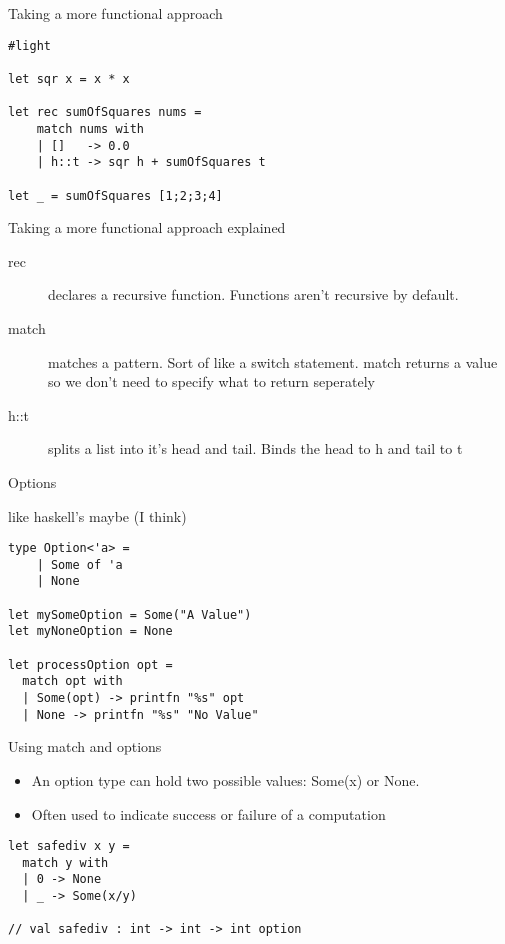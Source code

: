 \documentclass[landscape]{slides}
\begin{document}
\begin{slide}{Taking a more functional approach}
\begin{verbatim}
#light

let sqr x = x * x

let rec sumOfSquares nums =
    match nums with
    | []   -> 0.0
    | h::t -> sqr h + sumOfSquares t

let _ = sumOfSquares [1;2;3;4]
\end{verbatim}
\end{slide}

\begin{slide}{Taking a more functional approach explained}
\begin{description}
\item[rec] declares a recursive function. Functions aren't recursive by default.
\item[match] matches a pattern. Sort of like a switch statement. match returns a value so we don't need to specify what to return seperately
\item[h::t] splits a list into it's head and tail. Binds the head to h and tail to t
\end{description}
\end{slide}

\begin{slide}{Options}
\begin{description} 
\item like haskell's maybe (I think)
\begin{verbatim}
type Option<'a> =
    | Some of 'a
    | None

let mySomeOption = Some("A Value")
let myNoneOption = None

let processOption opt =
  match opt with
  | Some(opt) -> printfn "%s" opt
  | None -> printfn "%s" "No Value"
\end{verbatim}
\end{description}
\end{slide}

\begin{slide}{Using match and options}
\begin{itemize}
\item An option type can hold two possible values: Some(x) or None.
\item Often used to indicate success or failure of a computation
\end{itemize}
\begin{verbatim}
let safediv x y = 
  match y with
  | 0 -> None
  | _ -> Some(x/y)
 
// val safediv : int -> int -> int option
\end{verbatim}
\end{slide}
\end{document}

